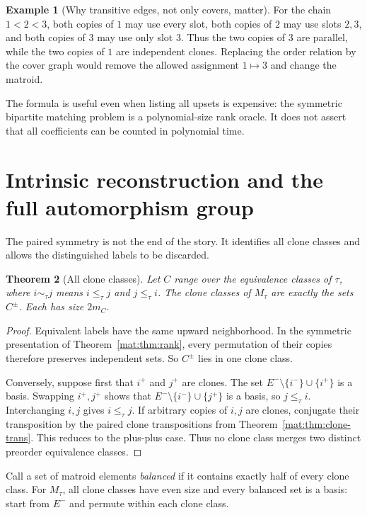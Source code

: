 \documentclass[11pt]{article}
\numberwithin{equation}{section}
\newtheorem{theorem}{Theorem}[section]
\theoremstyle{definition}
\newtheorem{example}[theorem]{Example}%
\begin{document}
\begin{example}[Why transitive edges, not only covers, matter]
For the chain $1<2<3$, both copies of $1$ may use every slot, both copies
of $2$ may use slots $2,3$, and both copies of $3$ may use only slot $3$.
Thus the two copies of $3$ are parallel, while the two copies of $1$ are
independent clones. Replacing the order relation by the cover graph would
remove the allowed assignment $1\mapsto3$ and change the matroid.
\end{example}

The formula is useful even when listing all upsets is expensive: the
symmetric bipartite matching problem is a polynomial-size rank oracle.
It does not assert that all coefficients can be counted in polynomial time.

\section{Intrinsic reconstruction and the full automorphism group}
\label{mat:sec:reconstruction}
The paired symmetry is not the end of the story. It identifies all clone
classes and allows the distinguished labels to be discarded.

\begin{theorem}[All clone classes]\label{mat:thm:all-clones}
Let $C$ range over the equivalence classes of $\tau$, where
$i\sim_\tau j$ means $i\leq_\tau j$ and $j\leq_\tau i$.
The clone classes of $M_\tau$ are exactly the sets $C^\pm$.
Each has size $2m_C$.
\end{theorem}
\begin{proof}
Equivalent labels have the same upward neighborhood. In the symmetric
presentation of Theorem~\ref{mat:thm:rank}, every permutation of their copies
therefore preserves independent sets. So $C^\pm$ lies in one clone class.

Conversely, suppose first that $i^+$ and $j^+$ are clones. The set
$E^-\setminus\{i^-\}\cup\{i^+\}$ is a basis. Swapping $i^+,j^+$ shows
that $E^-\setminus\{i^-\}\cup\{j^+\}$ is a basis, so $j\leq_\tau i$.
Interchanging $i,j$ gives $i\leq_\tau j$. If arbitrary copies of $i,j$ are
clones, conjugate their transposition by the paired clone transpositions
from Theorem~\ref{mat:thm:clone-trans}. This reduces to the plus-plus case.
Thus no clone class merges two distinct preorder equivalence classes.
\end{proof}

Call a set of matroid elements \emph{balanced} if it contains exactly half
of every clone class. For $M_\tau$, all clone classes have even size and
every balanced set is a basis: start from $E^-$ and permute within each
clone class.
\end{document}
